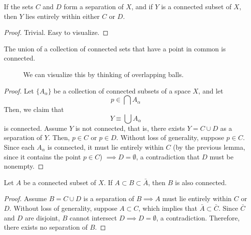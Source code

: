     \begin{lemma}
      If the sets $C$ and $D$ form a separation of $X$, and if $Y$ is a connected subset of $X$, then $Y$ lies entirely within either $C$ or $D$. 
    \end{lemma}
    \begin{proof}
      Trivial. Easy to visualize. 
    \end{proof}

    \begin{theorem}
      The union of a collection of connected sets that have a point in common is connected. 

      \begin{figure}[H]
        \centering 
        \caption{We can visualize this by thinking of overlapping balls. } 
        \label{fig:overlapping_circles}
      \end{figure}
    \end{theorem}
    \begin{proof}
      Let $\{A_\alpha\}$ be a collection of connected subsets of a space $X$, and let 
      \begin{equation}
        p \in \bigcap A_\alpha
      \end{equation}
      Then, we claim that 
      \begin{equation}
        Y \equiv \bigcup A_\alpha
      \end{equation}
      is connected. Assume $Y$ is not connected, that is, there exists $Y = C \cup D$ as a separation of $Y$. Then, $p \in C$ or $p \in D$. Without loss of generality, suppose $p \in C$. Since each $A_\alpha$ is connected, it must lie entirely within $C$ (by the previous lemma, since it contains the point $p \in C$) $\implies D = \emptyset$, a contradiction that $D$ must be nonempty. 
    \end{proof}

    \begin{theorem}
      Let $A$ be a connected subset of $X$. If $A \subset B \subset \bar{A}$, then $B$ is also connected. 
    \end{theorem}
    \begin{proof}
      Assume $B = C \cup D$ is a separation of $B \implies A$ must lie entirely within $C$ or $D$. Without loss of generality, suppose $A \subset C$, which implies that $\bar{A} \subset \bar{C}$. Since $\bar{C}$ and $D$ are disjoint, $B$ cannot intersect $D \implies D = \emptyset$, a contradiction. Therefore, there exists no separation of $B$. 
    \end{proof}

